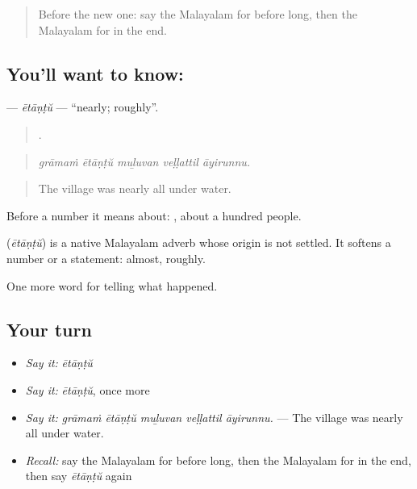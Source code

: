 \label{lesson:ML-C359-etantu}



\begin{quote}
Before the new one: say the Malayalam for before long, then the Malayalam for in the end.
\end{quote}

\subsection*{You'll want to know: }
\textbf{} — \emph{ētāṇṭŭ} — \textquotedblleft{}nearly; roughly\textquotedblright{}.

\begin{quote}
    .
\end{quote}

\begin{quote}
\emph{grāmaṁ ētāṇṭŭ muḻuvan veḷḷattil āyirunnu.}
\end{quote}

\begin{quote}
The village was nearly all under water.
\end{quote}

Before a number it means about:   , about a hundred people.

\begin{cousinweb}
\textbf{} (\emph{ētāṇṭŭ}) is a native Malayalam adverb whose origin is not settled. It softens a number or a statement: almost, roughly.
\end{cousinweb}

\begin{grammarlens}[title={What you've built}]
One more word for telling what happened.
\end{grammarlens}

\subsection*{Your turn}
\begin{itemize}
\raggedright
  \item \emph{Say it:} \emph{ētāṇṭŭ}
  \item \emph{Say it:} \emph{ētāṇṭŭ}, once more
  \item \emph{Say it:} \emph{grāmaṁ ētāṇṭŭ muḻuvan veḷḷattil āyirunnu.} — The village was nearly all under water.
  \item \emph{Recall:} say the Malayalam for before long, then the Malayalam for in the end, then say \emph{ētāṇṭŭ} again
\end{itemize}

